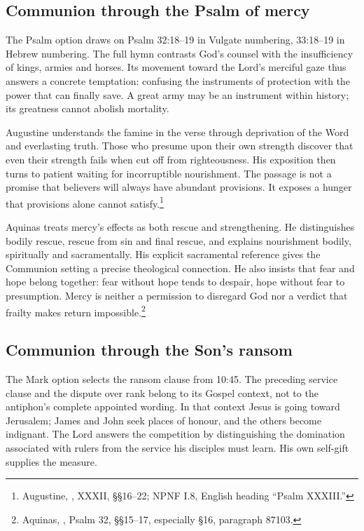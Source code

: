 \subsection{Communion through the Psalm of mercy}
The Psalm option draws on Psalm 32:18--19 in Vulgate numbering, 33:18--19 in Hebrew numbering. The full hymn contrasts God's counsel with the insufficiency of kings, armies and horses. Its movement toward the Lord's merciful gaze thus answers a concrete temptation: confusing the instruments of protection with the power that can finally save. A great army may be an instrument within history; its greatness cannot abolish mortality.

Augustine understands the famine in the verse through deprivation of the Word and everlasting truth. Those who presume upon their own strength discover that even their strength fails when cut off from righteousness. His exposition then turns to patient waiting for incorruptible nourishment. The passage is not a promise that believers will always have abundant provisions. It exposes a hunger that provisions alone cannot satisfy.\footnote{Augustine, , XXXII, §§16--22; NPNF I.8, English heading ``Psalm XXXIII.''}

Aquinas treats mercy's effects as both rescue and strengthening. He distinguishes bodily rescue, rescue from sin and final rescue, and explains nourishment bodily, spiritually and sacramentally. His explicit sacramental reference gives the Communion setting a precise theological connection. He also insists that fear and hope belong together: fear without hope tends to despair, hope without fear to presumption. Mercy is neither a permission to disregard God nor a verdict that frailty makes return impossible.\footnote{Aquinas, , Psalm 32, §§15--17, especially §16, paragraph 87103.}

\subsection{Communion through the Son's ransom}
The Mark option selects the ransom clause from 10:45. The preceding service clause and the dispute over rank belong to its Gospel context, not to the antiphon's complete appointed wording. In that context Jesus is going toward Jerusalem; James and John seek places of honour, and the others become indignant. The Lord answers the competition by distinguishing the domination associated with rulers from the service his disciples must learn. His own self-gift supplies the measure.


